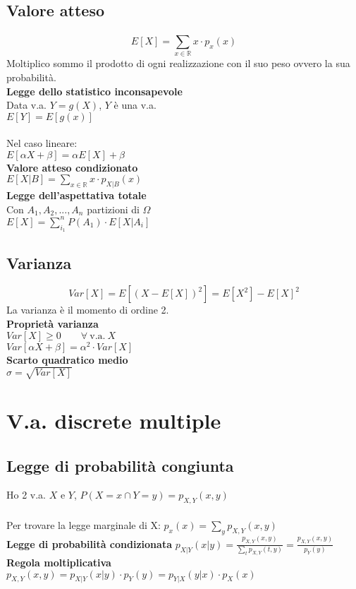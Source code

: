 \documentclass{article}
\begin{document}
\begin{multicols*}{3}
		
		
		\subsection{Valore atteso}
		\[E[X]= \sum_{x\in \mathbb{R}}^{} x \cdot p_x(x)\]
		Moltiplico sommo il prodotto di ogni realizzazione con il suo peso ovvero la sua probabilità.\\
		\textbf{Legge dello statistico inconsapevole}\\
		Data v.a. \(Y= g(X)\), \(Y\) è una v.a.\\
		\(E[Y]= E[g(x)]\)\\\\
		Nel caso lineare:\\
		\(E[\alpha X + \beta] = \alpha E[X] + \beta\)\\
		\textbf{Valore atteso condizionato}\\
		\(E[X|B]= \sum_{x\in \mathbb{R}}^{} x \cdot p_{X|B} (x) \)\\
		\textbf{Legge dell'aspettativa totale}\\
		Con \(A_1,A_2,...,A_n\) partizioni di \(\Omega\)\\
		\(E[X] = \sum_{i_1}^{n} P(A_1) \cdot E[X|A_i]\)
		
		\subsection{Varianza}
		\[Var[X] = E[(X-E[X])^2] = E[X^2]- E[X]^2\]
		La varianza è il momento di ordine 2.\\
		\textbf{Proprietà varianza}\\
		\(Var[X] \geq 0 \qquad \forall \ \text{v.a.} \ X\)\\
		\(Var[\alpha X + \beta] = \alpha^2 \cdot Var[X]\)\\
		\textbf{Scarto quadratico medio}\\
		\(\sigma = \sqrt{Var[X]}\)\\
		\section{V.a. discrete multiple}
		\subsection{Legge di probabilità congiunta}
		Ho 2 v.a. \(X\) e \(Y\), \(P({X=x}\cap{Y=y}) = p_{X,Y} (x,y) \)\\\\
		Per trovare la legge marginale di X: \(p_x (x) = \sum_{y}^{} p_{X,Y} (x,y)\)\\
		\textbf{Legge di probabilità condizionata}
		\(p_{X|Y} (x|y) = \frac{p_{X,Y} (x,y)}{\sum_{t}^{} p_{X,Y} (t,y)} = \frac{p_{X,Y} (x,y)}{p_Y (y)}\)\\
		\textbf{Regola moltiplicativa}\\
		\(p_{X,Y} (x,y) = p_{X|Y} (x|y) \cdot p_Y (y) = p_{Y|X} (y|x) \cdot p_X (x)\)\\

\end{multicols*}
\end{document}

